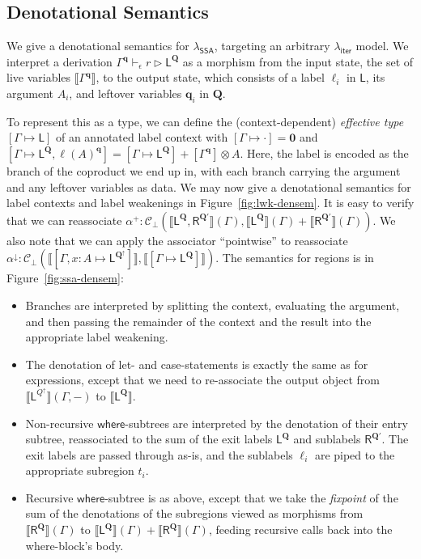 \documentclass[acmsmall,screen,review]{acmart}
\newcommand{\mc}[1]{\ensuremath{\mathcal{#1}}}
\newcommand{\mb}[1]{\ensuremath{\mathbf{#1}}}
\newcommand{\ms}[1]{\ensuremath{\mathsf{#1}}}
\newcommand{\haslb}[4]{#1 \vdash_{#2} #3 \rhd #4}
\newcommand{\etoty}[1]{[#1]}
\newcommand{\ltoty}[2]{[#1 \mapsto #2]}
\newcommand{\dnt}[1]{\llbracket{#1}\rrbracket}
\newcommand{\subiterexp}{\texorpdfstring{\(\lambda_{\ms{iter}}\)}{lambda-iter}}
\newcommand{\isotopessa}{\(\lambda_{\ms{SSA}}\)}
\newcommand{\zeroqv}[1]{#1^\uparrow}
\begin{document}
\subsection{Denotational Semantics}

We give a denotational semantics for \isotopessa{}, targeting an arbitrary
\subiterexp{} model. We interpret a derivation
$\haslb{\Gamma^{\mb{q}}}{\epsilon}{r}{\ms{L}^{\mb{Q}}}$ as a morphism from the input state, the set
of live variables $\dnt{\Gamma^{\mb{q}}}$, to the output state, which consists of a label $\ell_i$
in $\ms{L}$, its argument $A_i$, and leftover variables $\mb{q}_i$ in $\mb{Q}$. 

To represent this as a type, we can define the (context-dependent) \emph{effective type}
$\ltoty{\Gamma}{\ms{L}}$ of an annotated label context with $\ltoty{\Gamma}{\cdot} = \mb{0}$ and
$\ltoty{\Gamma}{\ms{L}^{\mb{Q}}, \ell(A)^{\mb{q}}} = \ltoty{\Gamma}{\ms{L}^{\mb{Q}}} +
\etoty{\Gamma^{\mb{q}}} \otimes A$.    
Here, the label is encoded as the branch of the coproduct we end up in, with each branch carrying
the argument and any leftover variables as data. We may now give a denotational semantics for label 
contexts and label weakenings in Figure~\ref{fig:lwk-densem}. 
It is easy to verify that we can reassociate 
$
\alpha^+ : \mc{C}_\bot(
  \dnt{\ms{L}^{\mb{Q}}, \ms{R}^{\mb{Q}'}}(\Gamma),
  \dnt{\ms{L}^{\mb{Q}}}(\Gamma) + \dnt{\ms{R}^{\mb{Q}'}}(\Gamma)
)
$.
We also note that we can apply the 
associator ``pointwise'' to reassociate
$\alpha^\downarrow: \mc{C}_\bot(
  \dnt{\ltoty{\Gamma, x : A}{\ms{L}^{\zeroqv{\mb{Q}}}}}, 
  \dnt{\ltoty{\Gamma}{\ms{L}^{\mb{Q}}}}
)$. 
%
The semantics for regions is in Figure~\ref{fig:ssa-densem}:
\begin{itemize}
  \item Branches are interpreted by splitting the context, evaluating the argument,
  and then passing the remainder of the context and the result into the appropriate
  label weakening.
  \item The denotation of let- and case-statements is exactly the same as for expressions,
  except that we need to re-associate the output object from 
  $\dnt{\ms{L}^{\zeroqv{Q}}}(\Gamma, -)$ to $\dnt{\ms{L}^{\mb{Q}}}$.
  \item Non-recursive \ms{where}-subtrees are interpreted by the denotation of their
  entry subtree, reassociated to the sum of the exit labels $\ms{L}^{\mb{Q}}$ and sublabels 
  $\ms{R}^{\mb{Q}'}$. The exit labels are passed through as-is, and the sublabels $\ell_i$ 
  are piped to the appropriate subregion $t_i$.
  \item Recursive \ms{where}-subtree is as above, except that we take the \emph{fixpoint} of the sum
  of the denotations of the subregions viewed as morphisms from $\dnt{\ms{R}^{\mb{Q}}}(\Gamma)$
  to $\dnt{\ms{L}^{\mb{Q}}}(\Gamma) + \dnt{\ms{R}^{\mb{Q}}}(\Gamma)$, feeding recursive
  calls back into the  where-block's body.
\end{itemize}
\end{document}
